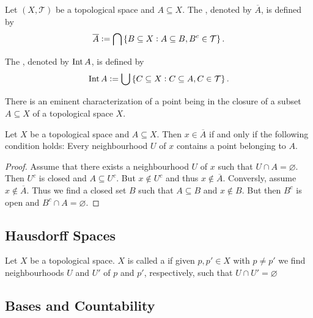 \begin{definition}
	Let $(X,\mathcal{T})$ be a topological space and $A \subseteq X$. The , denoted by $\overline{A}$, is defined by 
	\begin{equation}
		\overline{A} := \bigcap\cbr[0]{B \subseteq X : A \subseteq B, B^c \in \mathcal{T}}.
	\end{equation}

	The , denoted by $\operatorname{Int} A$, is defined by 
	\begin{equation}
		\Int A := \bigcup\cbr[0]{C \subseteq X: C \subseteq A, C \in \mathcal{T}}.	
	\end{equation}
\end{definition}

There is an eminent characterization of a point being in the closure of a subset $A \subseteq X$ of a topological space $X$.

\begin{proposition}
	Let $X$ be a topological space and $A \subseteq X$. Then $x \in \overline{A}$ if and only if the following condition holds: Every neighbourhood $U$ of $x$ contains a point belonging to $A$.
	\label{prop:characterization_closure}
\end{proposition}

\begin{proof}
	Assume that there exists a neighbourhood $U$ of $x$ such that $U \cap A = \varnothing$. Then $U^c$ is closed and $A \subseteq U^c$. But $x \notin U^c$ and thus $x \notin \overline{A}$. Conversly, assume $x \notin \overline{A}$. Thus we find a closed set $B$ such that $A \subseteq B$ and $x \notin B$. But then $B^c$ is open and $B^c \cap A = \varnothing$.
\end{proof}

\subsection{Hausdorff Spaces}

\begin{definition}
	Let $X$ be a topological space. $X$ is called a  if given $p,p' \in X$ with $p \neq p'$ we find neighbourhoods $U$ and $U'$ of $p$ and $p'$, respectively, such that $U \cap U' = \varnothing$	
\end{definition}

\subsection{Bases and Countability}

